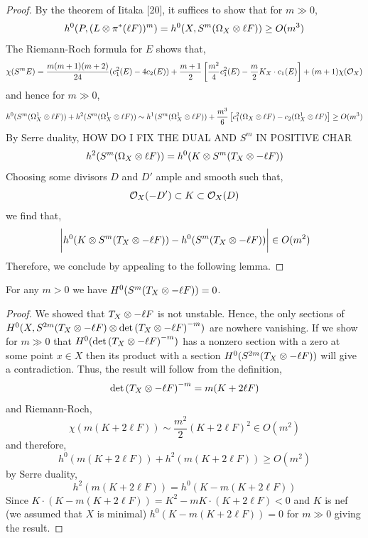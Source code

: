 \documentclass[main.tex]{subfiles}
\begin{document}
\begin{proof}
By the theorem of Iitaka [20], it suffices to show that for $m \gg 0$,
\[ h^0(P, (L \otimes \pi^* (\ell F))^m) = h^0(X, S^m(\Omega_X \otimes \ell F)) \ge O(m^3) \]
The Riemann-Roch formula for $E$ shows that,
\[ \chi(S^m E) = \frac{m (m+1)(m+2)}{24} (c_1^2(E) - 4 c_2(E)) + \frac{m+1}{2} \left[ \frac{m^2}{4} c_1^2(E) - \frac{m}{2} K_X \cdot c_1(E) \right]  + (m + 1) \chi(\mathcal{O}_X) \]
and hence for $m \gg 0$,
\[ h^0(S^m(\Omega_X^1 \otimes \ell F)) + h^2(S^m(\Omega_X^1 \otimes \ell F)) \sim h^1(S^m(\Omega_X^1 \otimes \ell F)) + \frac{m^3}{6} \left[ c_1^2(\Omega_X \otimes \ell F) - c_2(\Omega_X^1 \otimes \ell F) \right] \ge O(m^3) \]
By Serre duality, {\color{red} HOW DO I FIX THE DUAL AND $S^m$ IN POSITIVE CHAR}
\[ h^2(S^m(\Omega_X \otimes \ell F)) = h^0(K \otimes S^m(T_X \otimes -\ell F)) \]
Choosing some divisors $D$ and $D'$ ample and smooth such that,
\[ \mathcal{O}_X(-D') \subset K \subset \mathcal{O}_X(D) \]
we find that,
\[ \bigg| h^0(K \otimes S^m(T_X \otimes -\ell F)) - h^0(S^m(T_X \otimes -\ell F)) \bigg| \in O(m^2) \]
Therefore, we conclude by appealing to the following lemma.
\end{proof}

\begin{lemma}
For any $m > 0$ we have $H^0(S^m(T_X \otimes - \ell F)) = 0$.
\end{lemma}

\begin{proof}
We showed that $T_X \otimes -\ell F$ is not unstable. Hence, the only sections of $H^0(X, S^{2m}(T_X \otimes -\ell F) \otimes \det{(T_X \otimes-\ell F)}^{-m})$ are nowhere vanishing. If we show for $m \gg 0$ that $H^0(\det{(T_X \otimes- \ell F)}^{-m})$ has a nonzero section with a zero at some point $x \in X$ then its product with a section $H^0(S^{2m}(T_X \otimes - \ell F))$ will give a contradiction.
Thus, the result will follow from the definition,
\[ \det{(T_X \otimes- \ell F)}^{-m} = m (K + 2 \ell F) \]
and Riemann-Roch,
\[ \chi(m(K + 2 \ell F)) \sim \frac{m^2}{2} (K + 2 \ell F)^2 \in O(m^2) \]
and therefore,
\[ h^0(m(K + 2 \ell F)) + h^2(m(K + 2 \ell F)) \ge O(m^2) \]
by Serre duality,
\[ h^2(m(K + 2 \ell F)) = h^0(K - m(K + 2 \ell F)) \]
Since $K \cdot (K - m(K + 2 \ell F)) = K^2 - m K \cdot (K + 2 \ell F) < 0$ and $K$ is nef (we assumed that $X$ is minimal) $h^0(K - m (K + 2 \ell F)) = 0$ for $m \gg 0$ giving the result.
\end{proof}
\end{document}
